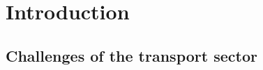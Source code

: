 \documentclass[first,firstsupp,lastsupp,last,hyperref,table]{ETHclass}
\begin{document}


\section{Introduction}

\subsection{Challenges of the transport sector}
\end{document}

